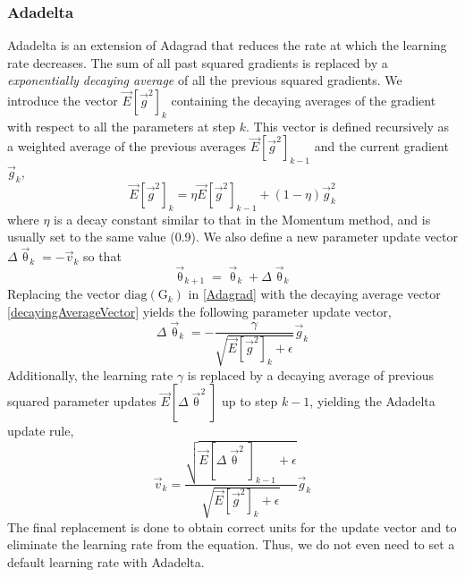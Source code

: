 \documentclass[twoside,english]{uiofysmaster}
\begin{document}
\subsubsection{Adadelta}
Adadelta \cite{Zeiler12} is an extension of Adagrad that reduces the rate at which the learning rate decreases. 
The sum of all past squared gradients is replaced by a \textit{exponentially decaying average} of all the previous squared gradients.
We introduce the vector $\vec{E}[\vec{g}^2]_k$ containing the decaying averages of the gradient
with respect to all the parameters at step $k$. 
This vector is defined recursively
as a weighted average of the previous averages $\vec{E}[\vec{g}^2]_{k-1}$ and the current gradient $\vec{g}_k$,
\begin{equation}
 \vec{E}[\vec{g}^2]_k = \eta \vec{E}[\vec{g}^2]_{k-1} + (1 - \eta) \vec{g}^2_k
 \label{decayingAverageVector}
\end{equation}
where $\eta$ is a decay constant similar to that in the Momentum method, and is usually set to the same value (0.9). 
We also define a new parameter update vector $\Delta \vec{\uptheta}_k = -\vec{v}_k$ so that
\begin{equation}
 \vec{\uptheta}_{k+1} = \vec{\uptheta}_k  + \Delta \vec{\uptheta}_k
\end{equation}
Replacing the vector $\mathrm{diag}(\mathrm{G}_k)$ in \eqref{Adagrad} with the decaying average vector \eqref{decayingAverageVector}
yields the following parameter update vector,
\begin{equation}
 \Delta \vec{\uptheta}_k = -\frac{\gamma}{\sqrt{\vec{E}[\vec{g}^2]_k + \epsilon}} \vec{g}_k
 \label{preliminiaryAdadelta}
\end{equation}
Additionally, the learning rate $\gamma$ is replaced by a decaying average of previous squared parameter updates
$\vec{E}[\Delta\vec{\uptheta}^2]$ up to step $k-1$, yielding the Adadelta update rule,
\begin{equation}
 \vec{v}_k = \frac{\sqrt{\vec{E}[\Delta\vec{\uptheta}^2]_{k-1} + \epsilon}}{\sqrt{\vec{E}[\vec{g}^2]_k + \epsilon}} \vec{g}_k
\end{equation}
The final replacement is done to obtain correct units for the update vector and to eliminate the learning rate from the equation. 
Thus, we do not even need to set a default learning rate with Adadelta. 
\end{document}
